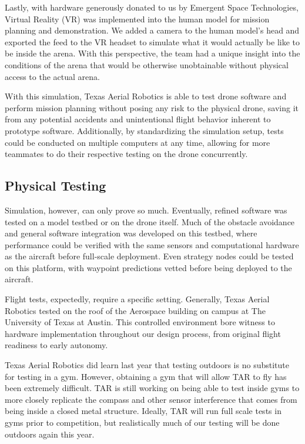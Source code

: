 \documentclass[12pt,letterpaper]{article}
\begin{document}
	Lastly, with hardware generously donated to us by Emergent Space Technologies, Virtual Reality (VR) was implemented into the human model for mission planning and demonstration. We added a camera to the human model’s head and exported the feed to the VR headset to simulate what it would actually be like to be inside the arena. With this perspective, the team had a unique insight into the conditions of the arena that would be otherwise unobtainable without physical access to the actual arena.
	
	With this simulation, Texas Aerial Robotics is able to test drone software and perform mission planning without posing any risk to the physical drone, saving it from any potential accidents and unintentional flight behavior inherent to prototype software. Additionally, by standardizing the simulation setup, tests could be conducted on multiple computers at any time, allowing for more teammates to do their respective testing on the drone concurrently. 


\subsection*{Physical Testing}
Simulation, however, can only prove so much. Eventually, refined software was tested on a model testbed or on the drone itself. Much of the obstacle avoidance and general software integration was developed on this testbed, where performance could be verified with the same sensors and computational hardware as the aircraft before full-scale deployment. Even strategy nodes could be tested on this platform, with waypoint predictions vetted before being deployed to the aircraft.

Flight tests, expectedly, require a specific setting. Generally, Texas Aerial Robotics tested on the roof of the Aerospace building on campus at The University of Texas at Austin. This controlled environment bore witness to hardware implementation throughout our design process, from original flight readiness to early autonomy.

Texas Aerial Robotics did learn last year that testing outdoors is no substitute for testing in a gym. However, obtaining a gym that will allow TAR to fly has been extremely difficult. TAR is still working on being able to test inside gyms to more closely replicate the compass and other sensor interference that comes from being inside a closed metal structure. Ideally, TAR will run full scale tests in gyms prior to competition, but realistically much of our testing will be done outdoors again this year. 
\end{document}
